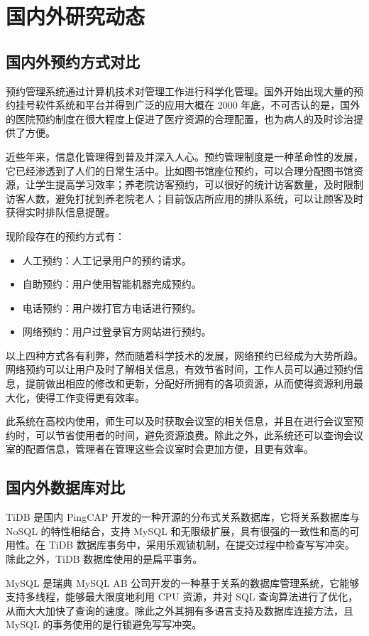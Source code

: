 \documentclass{izdthesis}
\begin{document}
\section{国内外研究动态}
\subsection{国内外预约方式对比}
预约管理系统通过计算机技术对管理工作进行科学化管理。国外开始出现大量的预约挂号软件系统和平台并得到广泛的应用大概在 2000 年底，不可否认的是，国外的医院预约制度在很大程度上促进了医疗资源的合理配置，也为病人的及时诊治提供了方便。

近些年来，信息化管理得到普及并深入人心。预约管理制度是一种革命性的发展，它已经渗透到了人们的日常生活中。比如图书馆座位预约，可以合理分配图书馆资源，让学生提高学习效率；养老院访客预约，可以很好的统计访客数量，及时限制访客人数，避免打扰到养老院老人；目前饭店所应用的排队系统，可以让顾客及时获得实时排队信息提醒。

现阶段存在的预约方式有\cite{ref2}：
\begin{itemize}
  \item 人工预约：人工记录用户的预约请求。
  \item 自助预约：用户使用智能机器完成预约。
  \item 电话预约：用户拨打官方电话进行预约。
  \item 网络预约：用户过登录官方网站进行预约。
\end{itemize}

以上四种方式各有利弊，然而随着科学技术的发展，网络预约已经成为大势所趋。网络预约可以让用户及时了解相关信息，有效节省时间，工作人员可以通过预约信息，提前做出相应的修改和更新，分配好所拥有的各项资源，从而使得资源利用最大化，使得工作变得更有效率。

此系统在高校内使用，师生可以及时获取会议室的相关信息，并且在进行会议室预约时，可以节省使用者的时间，避免资源浪费。除此之外，此系统还可以查询会议室的配置信息，管理者在管理这些会议室时会更加方便，且更有效率。

\subsection{国内外数据库对比}
TiDB 是国内 PingCAP 开发的一种开源的分布式关系数据库，它将关系数据库与 NoSQL 的特性相结合，支持 MySQL 和无限级扩展，具有很强的一致性和高的可用性\cite{ref3}。在 TiDB 数据库事务中，采用乐观锁机制，在提交过程中检查写写冲突。除此之外，TiDB 数据库使用的是扁平事务。

MySQL 是瑞典 MySQL AB 公司开发的一种基于关系的数据库管理系统，它能够支持多线程，能够最大限度地利用 CPU 资源，并对 SQL 查询算法进行了优化，从而大大加快了查询的速度。除此之外其拥有多语言支持及数据库连接方法，且 MySQL 的事务使用的是行锁避免写写冲突。
\end{document}
